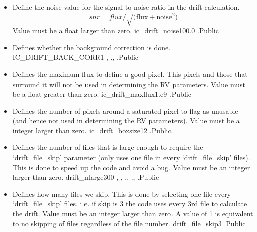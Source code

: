 \begin{itemize}


\item {}
{Define the noise value for the signal to noise ratio in the drift calculation.
\begin{equation}
snr = flux/\sqrt(\text{flux} + \text{noise}^2)
\end{equation}
Value must be a float larger than zero.
}
{ic\_drift\_noise}{100.0}
{\calDRIFTRAW}{\constantsfile}{\calDRIFTRAW.\progMAIN}{Public}


\item {} 
{Defines whether the background correction is done.}
{IC\_DRIFT\_BACK\_CORR}{1}
{\calDRIFTE, \calDRIFTPEAK}{\constantsfile}{\calDRIFTE.\progMAIN, \calDRIFTPEAK.\progMAIN}{Public}


\item {}
{Defines the maximum flux to define a good pixel. This pixels and those that surround it will not be used in determining the RV parameters. Value must be a float greater than zero.}
{ic\_drift\_maxflux}{1.e9}
{\calDRIFTRAW}{\constantsfile}{\calDRIFTRAW.\progMAIN}{Public}


\item {}
{Defines the number of pixels around a saturated pixel to flag as unusable (and hence not used in determining the RV parameters). Value must be a integer larger than zero.}
{ic\_drift\_boxsize}{12}
{\calDRIFTRAW}{\constantsfile}{\calDRIFTRAW.\progMAIN}{Public}


\item {}
{Defines the number of files that is large enough to require the `drift\_file\_skip' parameter (only uses one file in every `drift\_file\_skip' files). This is done to speed up the code and avoid a bug. Value must be an integer larger than zero.}
{drift\_nlarge}{300}
{\calDRIFTRAW, \calDRIFTE, \calDRIFTPEAK}{\constantsfile}{\calDRIFTRAW.\progMAIN, \calDRIFTE.\progMAIN, \calDRIFTPEAK.\progMAIN}{Public}


\item {}
{Defines how many files we skip. This is done by selecting one file every `drift\_file\_skip' files. i.e. if skip is 3 the code uses every 3rd file to calculate the drift. Value must be an integer larger than zero. A value of 1 is equivalent to no skipping of files regardless of the file number.}
{drift\_file\_skip}{3}
{\calDRIFTRAW}{\constantsfile}{\calDRIFTRAW.\progMAIN}{Public}



\end{itemize}
